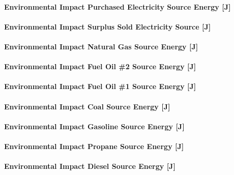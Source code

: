 \paragraph{Environmental Impact Purchased Electricity Source Energy {[}J{]}}\label{environmental-impact-purchased-electricity-source-energy-j}

\paragraph{Environmental Impact Surplus Sold Electricity Source {[}J{]}}\label{environmental-impact-surplus-sold-electricity-source-j}

\paragraph{Environmental Impact Natural Gas Source Energy {[}J{]}}\label{environmental-impact-natural-gas-source-energy-j}

\paragraph{Environmental Impact Fuel Oil \#2 Source Energy {[}J{]}}\label{environmental-impact-fuel-oil-2-source-energy-j}

\paragraph{Environmental Impact Fuel Oil \#1 Source Energy {[}J{]}}\label{environmental-impact-fuel-oil-1-source-energy-j}

\paragraph{Environmental Impact Coal Source Energy {[}J{]}}\label{environmental-impact-coal-source-energy-j}

\paragraph{Environmental Impact Gasoline Source Energy {[}J{]}}\label{environmental-impact-gasoline-source-energy-j}

\paragraph{Environmental Impact Propane Source Energy {[}J{]}}\label{environmental-impact-propane-source-energy-j}

\paragraph{Environmental Impact Diesel Source Energy {[}J{]}}\label{environmental-impact-diesel-source-energy-j}

